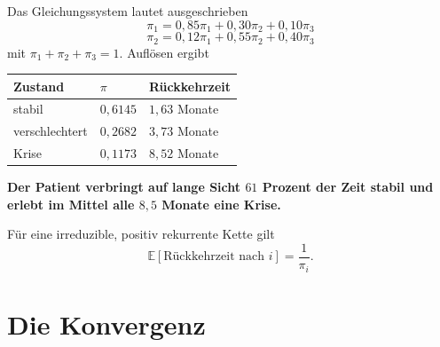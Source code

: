 \begin{merksatz}
Das Gleichungssystem lautet ausgeschrieben
\[ \pi_1 = 0{,}85\pi_1 + 0{,}30\pi_2 + 0{,}10\pi_3 \]
\[ \pi_2 = 0{,}12\pi_1 + 0{,}55\pi_2 + 0{,}40\pi_3 \]
mit $\pi_1+\pi_2+\pi_3 = 1$. Auflösen ergibt

\begin{center}
{\small
\renewcommand{\arraystretch}{1.5}
\begin{tabular}{@{}P{2.6cm}P{2.2cm}P{2.6cm}@{}}
\toprule
\textbf{Zustand} & $\pi$ & \textbf{Rückkehrzeit}\\
\midrule
stabil & $0{,}6145$ & $1{,}63$ Monate\\
verschlechtert & $0{,}2682$ & $3{,}73$ Monate\\
Krise & $0{,}1173$ & $8{,}52$ Monate\\
\bottomrule
\end{tabular}}
\end{center}

\begin{center}
\begin{minipage}{0.9\textwidth}
\textbf{Der Patient verbringt auf lange Sicht $61$ Prozent der Zeit stabil und erlebt im Mittel alle $8{,}5$ Monate eine Krise.}
\end{minipage}
\end{center}

Für eine irreduzible, positiv rekurrente Kette gilt
\[ \mathbb{E}[\text{Rückkehrzeit nach } i] = \frac{1}{\pi_i} . \]

\begin{center}
\begin{minipage}{0.88\textwidth}
\end{minipage}
\end{center}
\end{merksatz}

\section{Die Konvergenz}

